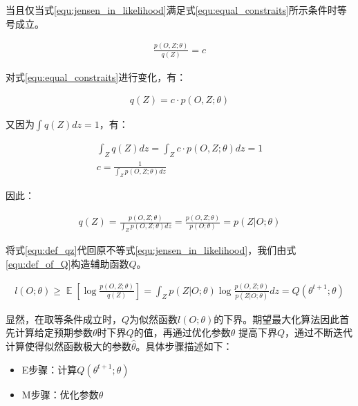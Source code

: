 当且仅当式\ref{equ:jensen_in_likelihood}满足式\ref{equ:equal_constraits}所示条件时等号成立。

\begin{equation}\label{equ:equal_constraits}
  \begin{aligned}
\frac{p(O,Z;\theta)}{q(Z)}=c
\end{aligned}\end{equation}

对式\ref{equ:equal_constraits}进行变化，有：

\begin{equation}\begin{aligned}
q(Z)=c\cdot p(O,Z;\theta)
\end{aligned}\end{equation}

又因为$\int q(Z)dz=1$，有：

\begin{equation}\begin{aligned}
\int_Z q(Z)dz=\int_Z c\cdot p(O,Z;\theta)dz=1\\
c=\frac{1}{\int_Zp(O,Z;\theta)dz}
\end{aligned}\end{equation}

因此：

\begin{equation}\label{equ:def_qz}
  \begin{aligned}
q(Z)=\frac{p(O,Z;\theta)}{\int_Zp(O,Z;\theta)dz}=\frac{p(O,Z;\theta)}{p(O;\theta)}=p(Z|O;\theta)
\end{aligned}\end{equation}

将式\ref{equ:def_qz}代回原不等式\ref{equ:jensen_in_likelihood}，我们由式\ref{equ:def_of_Q}构造辅助函数$Q$。

\begin{equation}\label{equ:def_of_Q}
  \begin{aligned}
l(O;\theta) \geq  \mathop{\mathbb{E}}[\log\frac{p(O,Z;\theta)}{q(Z)}]=\int_Zp(Z|O;\theta)\log \frac{p(O,Z;\theta)}{p(Z|O;\theta)}dz=Q(\theta^{t+1};\theta)
\end{aligned}\end{equation}

显然，在取等条件成立时，$Q$为似然函数$l(O;\theta)$的下界。期望最大化算法因此首先计算给定预期参数$\theta$时下界$Q$的值，再通过优化参数$\theta$ 提高下界$Q$，通过不断迭代计算使得似然函数极大的参数$\hat{\theta}$。具体步骤描述如下：

\begin{itemize}
    \item E步骤：计算$Q(\theta^{t+1};\theta)$
    \item M步骤：优化参数$\theta$
\end{itemize}


